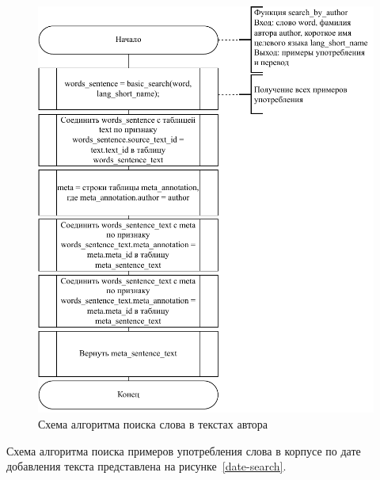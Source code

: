 \begin{figure}[ht]
	\centering
	\includegraphics[scale=1]{img/search-algo-author.pdf}
	\caption{Схема алгоритма поиска слова в текстах автора}
	\label{author-search}
\end{figure}\clearpage

Схема алгоритма поиска примеров употребления слова в корпусе по дате добавления текста представлена на рисунке~\ref{date-search}.

